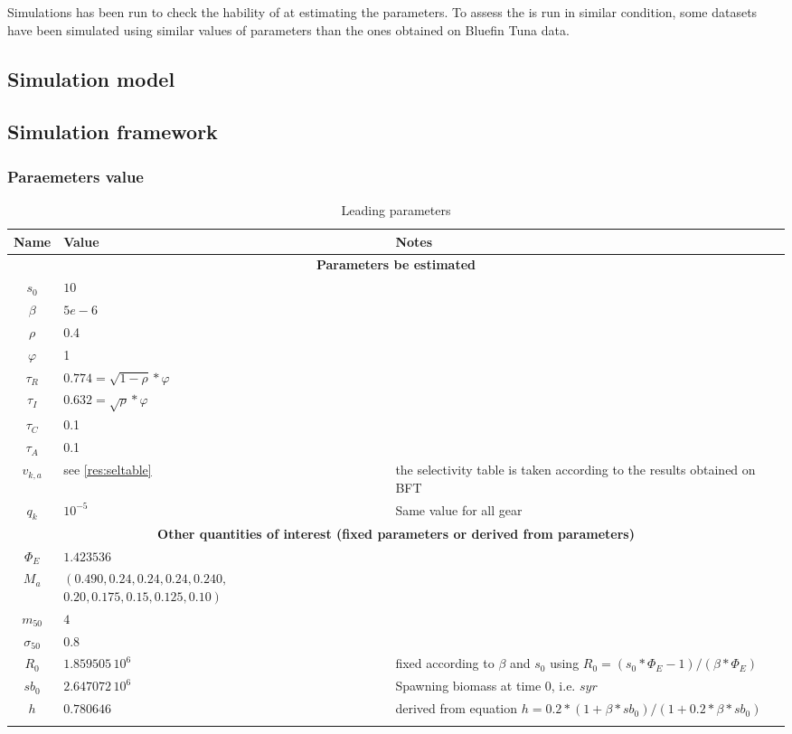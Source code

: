 Simulations has been run to check the hability of \iscam at estimating
the parameters. To assess the \iscam is run in similar condition, some
datasets have been  simulated using similar values  of parameters than
the ones obtained on Bluefin Tuna data. 

\subsection{Simulation model}
\subsection{Simulation framework}
\subsubsection{Paraemeters value}
\begin{table}[ht]
\centering
\begin{tabular}{ c  p{4cm}  p{8cm} }
  \hline
Name & Value & Notes \\ 
  \hline
\multicolumn{3}{c}{\bf Parameters be estimated}\\
$s_0$ & $10$ & \\
$\beta$ & $5e-6$ & \\
$\rho$ & 0.4 & \\
$\varphi$ & 1 & \\
$\tau_R$ & $0.774=\sqrt{1-\rho} * \varphi$ & \\
$\tau_I$ & $0.632=\sqrt{\rho} * \varphi$ & \\
$\tau_C$&0.1 &\\
$\tau_A$ & 0.1 & \\
$v_{k,a}$&  see \ref{res:seltable}  & the  selectivity table  is taken
according to the results obtained on BFT \\
$q_k$ & $10^{-5}$ & Same value for all gear\\
\multicolumn{3}{c}{\bf Other quantities  of interest (fixed parameters
  or derived from parameters)}\\
$\Phi_E$ & $1.423536 $ & \\
$M_a$ & $\left(0.490,0.24, 0.24, 0.24, 0.240,\right.$ $\left. 0.20, 
0.175 , 0.15, 0.125, 0.10\right)$&\\
$m_{50}$& $4$&\\
$\sigma_{50}$& $0.8$&\\
$R_0$ &  $1.859505\, 10^6$ & fixed  according to $\beta$ and  $s_0$ using
$R_0= (s_0*\Phi_E-1)/(\beta*\Phi_E)$ \\
$sb_0$ & $2.647072 \, 10^6$ & Spawning biomass at time 0, i.e. $syr$\\
$ h $ & $0.780646$ & derived from equation $h= 0.2 * (1+\beta*sb_0)/(1+0.2*\beta*sb_0)$\\

\\ \hline
\end{tabular}
\caption{Leading parameters}
\end{table}

